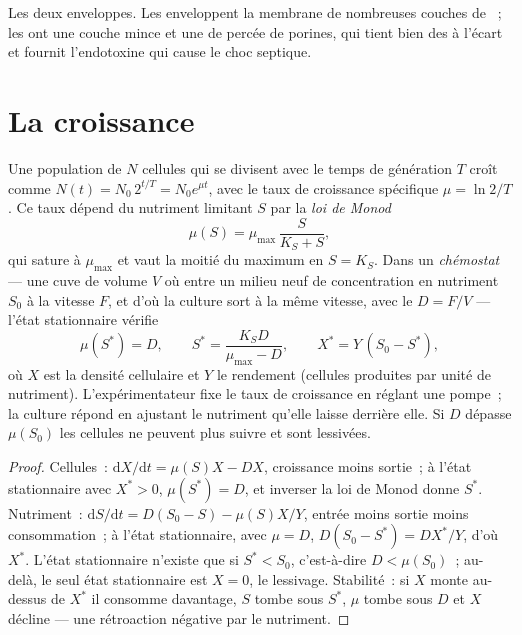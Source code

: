\begin{omfigure}
{\small Les deux enveloppes. Les  enveloppent la membrane
de nombreuses couches de ~; les  ont une
couche mince et une  de  percée de
porines, qui tient bien des  à l'écart et fournit
l'endotoxine qui cause le choc septique.}
\end{omfigure}

\section{La croissance}

\begin{theorem}\label{thm:b3:bacteriology:monod}
Une population de $N$ cellules qui se divisent avec le temps de
génération $T$ croît comme $N(t) = N_{0}\,2^{t/T} = N_{0}e^{\mu t}$,
avec le taux de croissance spécifique $\mu =
\ln 2/T$. Ce taux dépend du nutriment limitant $S$ par la \emph{loi de
Monod}
\[
\mu(S) = \mu_{\max}\,\frac{S}{K_{S} + S},
\]
qui sature à $\mu_{\max}$ et vaut la moitié du maximum en $S = K_{S}$.
Dans un \emph{chémostat} --- une cuve de volume $V$ où entre un milieu
neuf de concentration en nutriment $S_{0}$ à la vitesse $F$, et d'où la
culture sort à la même vitesse, avec le  $D = F/V$ ---
l'état stationnaire vérifie
\[
\mu(S^{*}) = D,\qquad S^{*} = \frac{K_{S}D}{\mu_{\max} - D},\qquad
X^{*} = Y\,(S_{0} - S^{*}),
\]
où $X$ est la densité cellulaire et $Y$ le rendement (cellules
produites par unité de nutriment). L'expérimentateur fixe le taux de
croissance en réglant une pompe~; la culture répond en ajustant le
nutriment qu'elle laisse derrière elle. Si $D$ dépasse $\mu(S_{0})$ les
cellules ne peuvent plus suivre et sont lessivées.
\end{theorem}
\begin{proof}
Cellules~: $\mathrm{d}X/\mathrm{d}t = \mu(S)X - DX$, croissance moins
sortie~; à l'état stationnaire avec $X^{*} > 0$, $\mu(S^{*}) = D$, et
inverser la loi de Monod donne $S^{*}$. Nutriment~:
$\mathrm{d}S/\mathrm{d}t = D(S_{0} -
S) - \mu(S)X/Y$, entrée moins sortie moins consommation~; à l'état
stationnaire, avec $\mu = D$, $D(S_{0} - S^{*}) = DX^{*}/Y$, d'où
$X^{*}$. L'état stationnaire n'existe que si $S^{*} < S_{0}$,
c'est-à-dire $D <
\mu(S_{0})$~; au-delà, le seul état stationnaire est $X = 0$, le
lessivage. Stabilité~: si $X$ monte au-dessus de $X^{*}$ il consomme
davantage, $S$ tombe sous $S^{*}$, $\mu$ tombe sous $D$ et $X$ décline
--- une rétroaction négative par le nutriment.
\end{proof}

